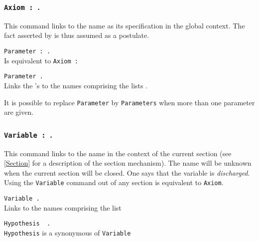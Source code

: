 \subsubsection{{\tt Axiom {\ident} : {\term}}.}
\label{Axiom}
This command links {\term} to the name {\ident} as its specification in the
global context. The fact asserted by {\term} is thus assumed
as a postulate.

\begin{ErrMsgs}
\item {}
\end{ErrMsgs}

\begin{Variants} 
\item {\tt Parameter {\ident} : {\term}.}
  \\
  Is equivalent to {\tt Axiom {\ident} : {\term}}
\item {\tt Parameter \nelist{\nelist{\ident}{,} : {\term}}{;} {\tt .}} \\
  Links the {\term}'s to the names comprising the lists \nelist{\nelist{\ident}{,} : {\term}}{;}.
\end{Variants}

 It is possible to replace {\tt Parameter} by
{\tt Parameters} when more than one parameter are given.

\subsubsection{{\tt Variable {\ident} : {\term}}.}
This command links {\term} to the name {\ident} in the context of the
current section (see \ref{Section} for a description of the section
mechanism). The name {\ident} will be unknown when the current
section will be closed. One says that the variable is {\em
  discharged}. Using the {\tt Variable} command out of any section is
equivalent to {\tt Axiom}.

\begin{ErrMsgs}
\item {}
\end{ErrMsgs}

\begin{Variants}
\item {\tt Variable \nelist{\nelist{\ident}{,}:{\term}}{;} {\tt .}}\\
  Links {\term} to the
  names comprising the list \nelist{\nelist{\ident}{,}:{\term}}{;}
\item {\tt Hypothesis \nelist{\nelist{\ident}{,} $\;$:$\;$ {\term}}{;} {\tt
 .}} \\  %
  \texttt{Hypothesis} is a synonymous of \texttt{Variable}
\end{Variants}

